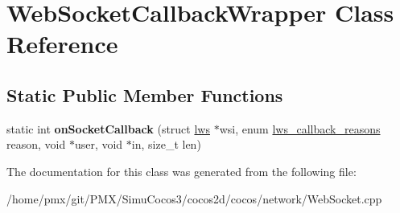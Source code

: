 \hypertarget{classWebSocketCallbackWrapper}{}\section{Web\+Socket\+Callback\+Wrapper Class Reference}
\label{classWebSocketCallbackWrapper}
\subsection*{Static Public Member Functions}
\begin{DoxyCompactItemize}
\item 
\mbox{\label{classWebSocketCallbackWrapper_ab22a36abe1f2ce0667a77ddb96ed5ee6}} 
static int {\bfseries on\+Socket\+Callback} (struct \hyperlink{structlws}{lws} $\ast$wsi, enum \hyperlink{group__usercb_gad62860e19975ba4c4af401c3cdb6abf7}{lws\+\_\+callback\+\_\+reasons} reason, void $\ast$user, void $\ast$in, size\+\_\+t len)
\end{DoxyCompactItemize}


The documentation for this class was generated from the following file\+:\begin{DoxyCompactItemize}
\item 
/home/pmx/git/\+P\+M\+X/\+Simu\+Cocos3/cocos2d/cocos/network/Web\+Socket.\+cpp\end{DoxyCompactItemize}
